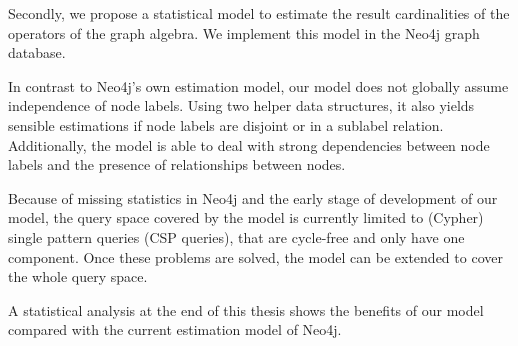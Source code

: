 Secondly, we propose a statistical model to estimate the result
cardinalities of the operators of the graph algebra.
We implement this model in the Neo4j graph database.

In contrast to Neo4j's own estimation model, our model does
not globally assume independence of node labels.
Using two helper data structures, it also yields sensible estimations if node
labels are disjoint or in a sublabel relation.
Additionally, the model is able to deal with strong dependencies
between node labels and the presence of relationships between nodes.

Because of missing statistics in
Neo4j and the early stage of development of our model, the query space covered
by the model is currently limited to (Cypher) single pattern queries
(CSP queries), that are cycle-free and only have one component.
Once these problems are solved, the model can be extended to cover
the whole query space.

A statistical analysis at the end of this thesis
shows the benefits of our model compared with the
current estimation model of Neo4j.
